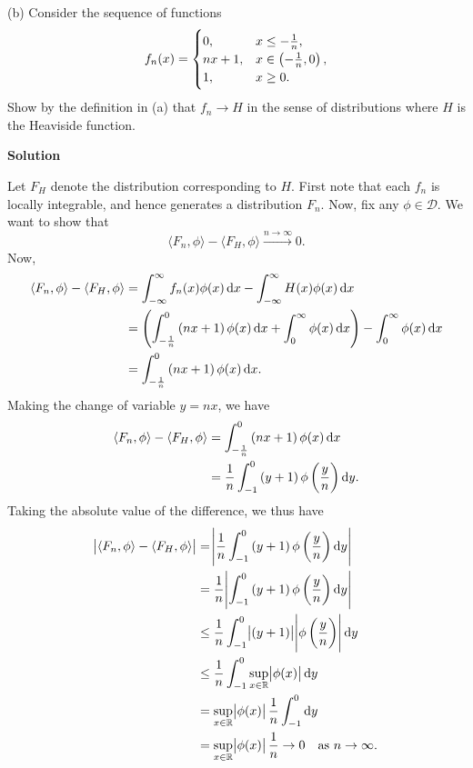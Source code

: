 \documentclass{article}
\begin{document}
\vspace{5mm}

(b) Consider the sequence of functions
%
\begin{equation*}
    f_n(x) =
        \begin{cases}
            0, & x \leq -\frac{1}{n}, \\
            n x + 1, & x \in \del{- \frac{1}{n}, 0}, \\
            1, & x \geq 0.
        \end{cases}
\end{equation*}
%
Show by the definition in (a) that $f_n \to H$ in the sense of
distributions where $H$ is the Heaviside function.

\textbf{Solution}

Let $F_H$ denote the distribution corresponding to $H$. First note that
each $f_n$ is locally integrable, and hence generates a distribution
$F_n$. Now, fix any $\phi \in \mathcal{D}$. We want to show that
%
\begin{equation*}
    \langle F_n, \phi \rangle - \langle F_H, \phi \rangle \xrightarrow{n \to \infty} 0
    .
\end{equation*}
%
Now,
%
\begin{align*}
    \langle F_n, \phi \rangle - \langle F_H, \phi \rangle
        &= \int_{- \infty}^\infty f_n(x) \phi(x) \dif x
            - \int_{- \infty}^\infty H(x) \phi(x) \dif x \\
        &= \del{
                \int_{- \frac{1}{n}}^0 \del{n x + 1} \phi(x) \dif x
                + \int_{0}^\infty \phi(x) \dif x
            }
            - \int_{0}^\infty \phi(x) \dif x \\
        &= \int_{- \frac{1}{n}}^0 \del{n x + 1} \phi(x) \dif x
        .
\end{align*}
%
Making the change of variable $y = n x$, we have
%
\begin{align*}
    \langle F_n, \phi \rangle - \langle F_H, \phi \rangle
        &= \int_{- \frac{1}{n}}^0 \del{n x + 1} \phi(x) \dif x \\
        &= \frac{1}{n} \int_{-1}^0 \del{y + 1} \phi \del{\frac{y}{n}} \dif y
        .
\end{align*}
%
Taking the absolute value of the difference, we thus have
%
\begin{align*}
    \envert{\langle F_n, \phi \rangle - \langle F_H, \phi \rangle}
        &= \envert{\frac{1}{n} \int_{-1}^0 \del{y + 1} \phi \del{\frac{y}{n}} \dif y} \\
        &= \frac{1}{n} \envert{\int_{-1}^0 \del{y + 1} \phi \del{\frac{y}{n}} \dif y} \\
        &\leq \frac{1}{n} \int_{-1}^0 \envert{\del{y + 1}} \envert{\phi \del{\frac{y}{n}}} \dif y \\
        &\leq \frac{1}{n} \int_{-1}^0 \sup_{x \in \mathbb{R}} \envert{\phi(x)} \dif y \\
        &= \sup_{x \in \mathbb{R}}\envert{\phi(x)} \frac{1}{n} \int_{-1}^0  \dif y \\
        &= \sup_{x \in \mathbb{R}}\envert{\phi(x)} \frac{1}{n} \to 0 \quad \text{as } n \to \infty
        .
\end{align*}
\end{document}
